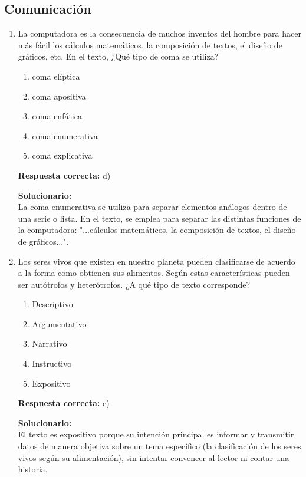 \subsection*{Comunicación}

\begin{enumerate}
	
\item La computadora es la consecuencia de muchos inventos del hombre para hacer más fácil los cálculos matemáticos, la composición de textos, el diseño de gráficos, etc.
En el texto, ¿Qué tipo de coma se utiliza?

\begin{enumerate}[label=\alph*)]
	\item coma elíptica
	\item coma apositiva
	\item coma enfática
	\item coma enumerativa
	\item coma explicativa
\end{enumerate}

\textbf{Respuesta correcta:} d)

\vspace{2mm}
\textbf{Solucionario:}\\
La coma enumerativa se utiliza para separar elementos análogos dentro de una serie o lista. En el texto, se emplea para separar las distintas funciones de la computadora: "...cálculos matemáticos, la composición de textos, el diseño de gráficos...".

\vspace{6mm}

\item Los seres vivos que existen en nuestro planeta pueden clasificarse de acuerdo a la forma como obtienen sus alimentos. Según estas características pueden ser autótrofos y heterótrofos.
¿A qué tipo de texto corresponde?

\begin{enumerate}[label=\alph*)]
	\item Descriptivo
	\item Argumentativo
	\item Narrativo
	\item Instructivo
	\item Expositivo
\end{enumerate}

\textbf{Respuesta correcta:} e)

\vspace{2mm}
\textbf{Solucionario:}\\
El texto es expositivo porque su intención principal es informar y transmitir datos de manera objetiva sobre un tema específico (la clasificación de los seres vivos según su alimentación), sin intentar convencer al lector ni contar una historia.


\end{enumerate}
